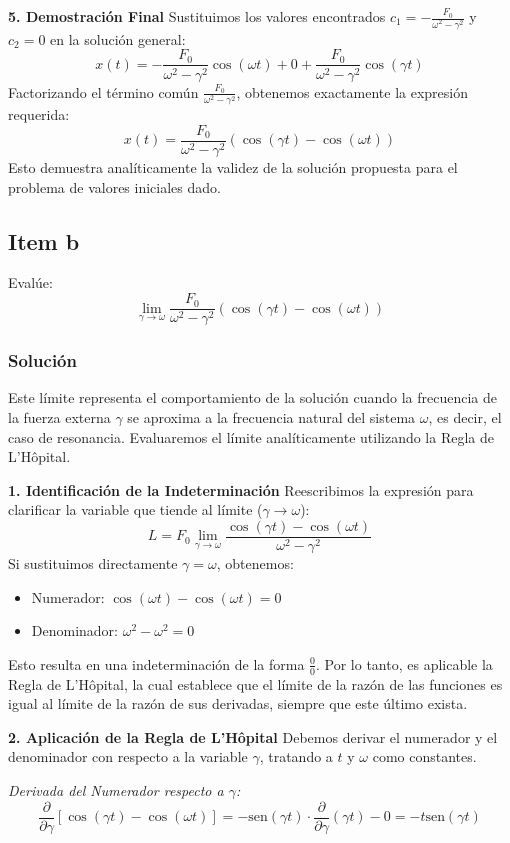 \documentclass[a4paper]{article}
\begin{document}
\textbf{5. Demostración Final}
Sustituimos los valores encontrados $c_1 = -\frac{F_0}{\omega^2 - \gamma^2}$ y $c_2 = 0$ en la solución general:
$$
x(t) = -\frac{F_0}{\omega^2 - \gamma^2} \cos(\omega t) + 0 + \frac{F_0}{\omega^2 - \gamma^2} \cos(\gamma t)
$$
Factorizando el término común $\frac{F_0}{\omega^2 - \gamma^2}$, obtenemos exactamente la expresión requerida:
$$
x(t) = \frac{F_0}{\omega^2 - \gamma^2} (\cos(\gamma t) - \cos(\omega t))
$$
Esto demuestra analíticamente la validez de la solución propuesta para el problema de valores iniciales dado.

\subsection{Item b}
Evalúe:
$$
\lim_{\gamma \to \omega} \frac{F_0}{\omega^2 - \gamma^2} (\cos(\gamma t) - \cos(\omega t))
$$

\subsubsection{Solución}
Este límite representa el comportamiento de la solución cuando la frecuencia de la fuerza externa $\gamma$ se aproxima a la frecuencia natural del sistema $\omega$, es decir, el caso de resonancia. Evaluaremos el límite analíticamente utilizando la Regla de L'Hôpital.

\textbf{1. Identificación de la Indeterminación}
Reescribimos la expresión para clarificar la variable que tiende al límite ($\gamma \to \omega$):
$$
L = F_0 \lim_{\gamma \to \omega} \frac{\cos(\gamma t) - \cos(\omega t)}{\omega^2 - \gamma^2}
$$
Si sustituimos directamente $\gamma = \omega$, obtenemos:
\begin{itemize}
    \item Numerador: $\cos(\omega t) - \cos(\omega t) = 0$
    \item Denominador: $\omega^2 - \omega^2 = 0$
\end{itemize}
Esto resulta en una indeterminación de la forma $\frac{0}{0}$. Por lo tanto, es aplicable la Regla de L'Hôpital, la cual establece que el límite de la razón de las funciones es igual al límite de la razón de sus derivadas, siempre que este último exista.

\textbf{2. Aplicación de la Regla de L'Hôpital}
Debemos derivar el numerador y el denominador con respecto a la variable $\gamma$, tratando a $t$ y $\omega$ como constantes.

\textit{Derivada del Numerador respecto a $\gamma$:}
$$
\frac{\partial}{\partial \gamma} [\cos(\gamma t) - \cos(\omega t)] = -\text{sen}(\gamma t) \cdot \frac{\partial}{\partial \gamma}(\gamma t) - 0 = -t \text{sen}(\gamma t)
$$
\end{document}

